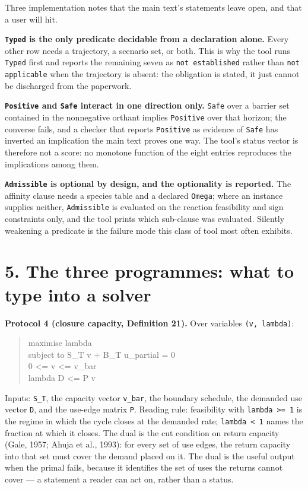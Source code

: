 \documentclass[11pt]{article}
\begin{document}
Three implementation notes that the main text's statements leave open, and that a user will hit.

\textbf{\texttt{Typed} is the only predicate decidable from a declaration alone.} Every other row needs a trajectory, a scenario set, or both. This is why the tool runs \texttt{Typed} first and reports the remaining seven as \texttt{not established} rather than \texttt{not applicable} when the trajectory is absent: the obligation is stated, it just cannot be discharged from the paperwork.

\textbf{\texttt{Positive} and \texttt{Safe} interact in one direction only.} \texttt{Safe} over a barrier set contained in the nonnegative orthant implies \texttt{Positive} over that horizon; the converse fails, and a checker that reports \texttt{Positive} as evidence of \texttt{Safe} has inverted an implication the main text proves one way. The tool's status vector is therefore not a score: no monotone function of the eight entries reproduces the implications among them.

\textbf{\texttt{Admissible} is optional by design, and the optionality is reported.} The affinity clause needs a species table and a declared \texttt{Omega}; where an instance supplies neither, \texttt{Admissible} is evaluated on the reaction feasibility and sign constraints only, and the tool prints which sub-clause was evaluated. Silently weakening a predicate is the failure mode this class of tool most often exhibits.

\vspace{0.8em}

\section*{5. The three programmes: what to type into a solver}\label{5-the-three-programmes-what-to-type-into-a-solver}

\textbf{Protocol 4 (closure capacity, Definition 21).} Over variables \texttt{(v, lambda)}:

\begin{quote}\ttfamily\footnotesize\raggedright\setlength{\parskip}{0pt}
maximise   lambda\\
subject to S\_T v + B\_T u\_partial = 0\\
           0 <= v <= v\_bar\\
           lambda D <= P v
\end{quote}

Inputs: \texttt{S\_T}, the capacity vector \texttt{v\_bar}, the boundary schedule, the demanded use vector \texttt{D}, and the use-edge matrix \texttt{P}. Reading rule: feasibility with \texttt{lambda >= 1} is the regime in which the cycle closes at the demanded rate; \texttt{lambda < 1} names the fraction at which it closes. The dual is the cut condition on return capacity (Gale, 1957; Ahuja et al., 1993): for every set of use edges, the return capacity into that set must cover the demand placed on it. The dual is the useful output when the primal fails, because it identifies the set of uses the returns cannot cover --- a statement a reader can act on, rather than a status.
\end{document}
